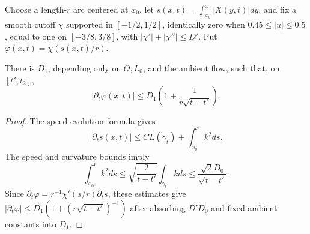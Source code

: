 Choose a length-$r$ arc centered at $x_0$, let
$s(x,t)=\int_{x_0}^x|X(y,t)|dy$, and fix a smooth cutoff $\chi$ supported in
$[-1/2,1/2]$, identically zero when $0.45\le |u|\le0.5$, equal to one on
$[-3/8,3/8]$, with
$|\chi'|+|\chi''|\le D'$.  Put $\varphi(x,t)=\chi(s(x,t)/r)$.

\begin{theorem}
\label{lem:localized-cutoff-time-derivative}
\notready
There is $D_1$, depending only on $\Theta,L_0$, and the ambient flow, such
that, on $[t',t_2]$,
\[
 |\partial_t\varphi(x,t)|
 \le D_1\left(1+\frac1{r\sqrt{t-t'}}\right).
\]
\end{theorem}
\begin{proof}
The speed evolution formula gives
\[
 |\partial_ts(x,t)|
 \le C L(\gamma_t)+\int_{x_0}^x k^2ds.
\]
The speed and curvature bounds imply
\[
 \int_{x_0}^xk^2ds
 \le\sqrt{\frac2{t-t'}}\int_{\gamma_t}kds
 \le\frac{\sqrt2D_0}{\sqrt{t-t'}}.
\]
Since $\partial_t\varphi=r^{-1}\chi'(s/r)\partial_ts$, these estimates give
$|\partial_t\varphi|\le D_1(1+(r\sqrt{t-t'})^{-1})$ after absorbing
$D'D_0$ and fixed ambient constants into $D_1$.
\end{proof}

